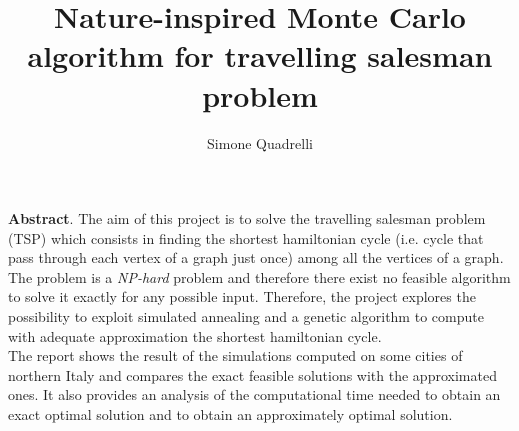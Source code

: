 \documentclass{article}
\begin{document}
\title{Nature-inspired Monte Carlo algorithm for travelling salesman problem}
\author{Simone Quadrelli}
\maketitle
\noindent \textbf{Abstract}. The aim of this project is to solve the travelling salesman problem (TSP) which consists in finding the shortest hamiltonian cycle (i.e. cycle that pass through each vertex of a graph just once) among all the vertices of a graph. \\
The problem is a \textit{NP-hard} problem and therefore there exist no feasible algorithm to solve it exactly for any possible input. Therefore, the project explores the possibility to exploit simulated annealing and a genetic algorithm to compute with adequate approximation the shortest hamiltonian cycle.\\
The report shows the result of the simulations computed on some cities of northern Italy and compares the exact feasible solutions with the approximated ones. It also provides an analysis of the computational time needed to obtain an exact optimal solution and to obtain an approximately optimal solution.
\end{document}
